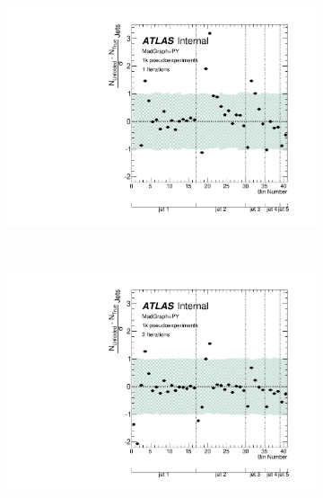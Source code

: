 \clearpage
\begin{figure}
\begin{subfigure}[]{0.5\textwidth}
\includegraphics[width=\textwidth]{fig/Stress/110872atlfast/Pull1Iterations.pdf}
\end{subfigure}
~
\begin{subfigure}[]{0.5\textwidth}
\includegraphics[width=\textwidth]{fig/Stress/110872atlfast/Pull2Iterations.pdf}
\end{subfigure}
\\
\begin{subfigure}[]{0.5\textwidth}

\end{subfigure}
\end{figure}
